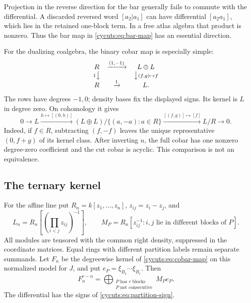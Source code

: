 Projection in the reverse direction for the bar generally fails to
commute with the differential. A discarded reversed word $[a_2|a_1]$
can have differential $[a_2a_1]$, which lies in the retained one-block
term. In a free atlas algebra that product is nonzero. Thus the
bar map in \eqref{cycuts:eq:bar-map} has an essential direction.

For the dualizing coalgebra, the binary cobar map is especially simple:
\begin{equation}\label{cycuts:eq:binary-quotient}
 \begin{array}{ccc}
 R&\xrightarrow{(1,-1)}&L\oplus L\\
 {\scriptstyle1}\big\downarrow&&
        \big\downarrow{\scriptstyle(f,g)\mapsto f}\\
 R&\xrightarrow{1}&L.
 \end{array}
\end{equation}
The rows have degrees $-1,0$; density bases fix the displayed signs.
Its kernel is $L$ in degree zero. On cohomology it gives
\[
 0\longrightarrow L\xrightarrow{h\mapsto[(0,h)]}
 (L\oplus L)/\{(a,-a):a\in R\}
 \xrightarrow{[(f,g)]\mapsto[f]}L/R\longrightarrow0.
\]
Indeed, if $f\in R$, subtracting $(f,-f)$ leaves the unique
representative $(0,f+g)$ of its kernel class. After inverting $u$,
the full cobar has one nonzero degree-zero coefficient and the cut
cobar is acyclic. This comparison is not an equivalence.

\subsection{The ternary kernel}

For the affine line put $R_n=k[z_1,\ldots,z_n]$, $z_{ij}=z_i-z_j$,
and
\begin{equation}\label{cycuts:eq:localization-modules}
 L_n=R_n\left[\left(\prod_{i<j}z_{ij}\right)^{-1}\right],
 \qquad
 M_P=R_n[z_{ij}^{-1}:i,j\text{ lie in different blocks of }P].
\end{equation}
All modules are tensored with the common right density, suppressed
in the coordinate matrices. Equal rings with different partition
labels remain separate summands. Let $F_n$ be the degreewise kernel of
\eqref{cycuts:eq:cobar-map} on this normalized model for $J$, and put
$e_P=\xi_{B_1}\cdots\xi_{B_r}$. Then
\begin{equation}\label{cycuts:eq:discarded}
 F_n^{r-n}=\bigoplus_{\substack{P\text{ has }r\text{ blocks}\\
                              P\text{ not consecutive}}}M_Pe_P.
\end{equation}
The differential has the signs of \eqref{cycuts:eq:partition-sign}.

